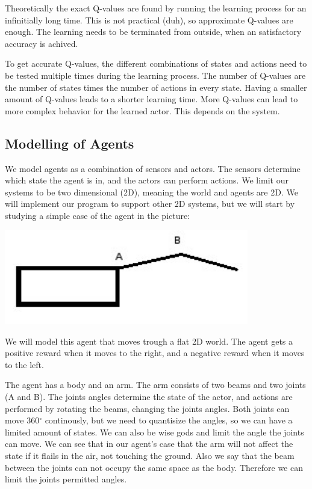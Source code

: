 \documentclass{article}
\begin{document}
Theoretically the exact Q-values are found by running the learning process
for an infinitially long time. This is not practical (duh), so approximate
Q-values are enough. The learning needs to be terminated from outside, when an
satisfactory accuracy is achived.

To get accurate Q-values, the different combinations of states and actions
need to be tested multiple times during the learning process.
The number of Q-values are the number of states times the number of actions
in every state. Having a smaller amount of Q-values leads to a shorter learning
time. More Q-values can lead to more complex behavior for the learned actor.
This depends on the system.


\subsection{Modelling of Agents}
We model agents as a combination of sensors and actors. The sensors determine
which state the agent is in, and the actors can perform actions.
We limit our systems to be two dimensional (2D), meaning the world and agents
are 2D. We will implement our program to support other 2D systems, but we
will start by studying a simple case of the agent in the picture:

\includegraphics[width=0.8\textwidth]{simple_agent}

We will model this agent that moves trough a flat 2D world.
The agent gets a positive reward when it moves to the right, and a negative
reward when it moves to the left.

The agent has a body and an arm. The arm consists of two beams and two joints
(A and B). The joints angles determine the state of the actor, and actions are
performed by rotating the beams, changing the joints angles.
Both joints can move 360$^\circ$ continously, but we need to quantisize
the angles, so we can have a limited amount of states. We can also be wise
gods and limit the angle the joints can move. We can see that in our agent's
case that the arm will not affect the state if it flails in the air, not
touching the ground. Also we say that the beam between the joints can not
occupy the same space as the body. Therefore we can limit the joints
permitted angles.
\end{document}
